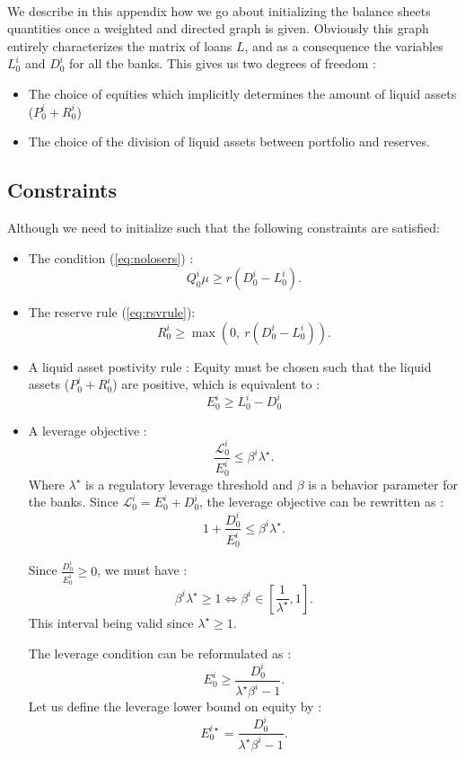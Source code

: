 \documentclass{article}
\begin{document}
\begin{appendices}
\paragraph{}
We describe in this appendix how we go about initializing the balance sheets quantities once a weighted and directed graph is given. Obviously this graph entirely characterizes the matrix of loans $L$, and as a consequence the variables $L_0^i$ and $D_0^i$ for all the banks. This gives us two degrees of freedom : 

\begin{itemize}
\item The choice of equities which implicitly determines the amount of liquid assets ($P_0^i + R_0^i$)
\item The choice of the division of liquid assets between portfolio and reserves.
\end{itemize}

\subsection{Constraints}

Although we need to initialize such that the following constraints are satisfied:
\begin{itemize}
\item The condition (\ref{eq:nolosers}) : $$Q_0^{i} \mu \geq r(D_0^i - L_0^i).$$
\item The reserve rule (\ref{eq:rsvrule}): $$R_0^i \geq \max(0,~ r(D_0^i - L_0^i)).$$

\item A liquid asset postivity rule : Equity must be chosen such that the liquid assets ($P_0^i + R_0^i$) are positive, which is equivalent to : 
$$E_0^i \geq L_0^i - D_0^i $$
\item A leverage objective : $$ \frac{\mathcal{L}_0^i}{E_0^i} \leq \beta^i \lambda^{\star}.$$ Where $\lambda^{\star}$ is a regulatory leverage threshold and $\beta$ is a behavior parameter for the banks.
Since $\mathcal{L}_0^i = E_0^i + D_0^i$, the leverage objective can be rewritten as : 
$$ 1 + \frac{D_0^i}{E_0^i} \leq \beta^i \lambda^{\star}.$$

Since $\frac{D_0^i}{E_0^i} \geq 0$, we must have :
$$\beta^i \lambda^{\star} \geq 1 \Leftrightarrow \beta^i \in [\frac{1}{\lambda^{\star}}, 1 ].$$
This interval being valid since $\lambda^{\star} \geq 1.$

The leverage condition can be reformulated as : 
$$ E_0^i \geq \frac{D_0^i}{\lambda^{\star}\beta^i - 1}.$$
Let us define the leverage lower bound on equity by : 
$$ E_0^{i \star} = \frac{D_0^i}{\lambda^{\star}\beta^i - 1}.$$ 
\end{itemize}




\end{appendices}
\end{document}
